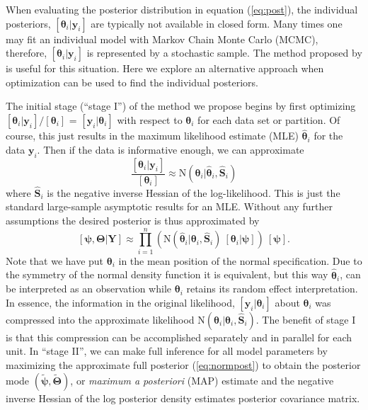 \documentclass[12pt]{article}
\newcommand{\by}{\mathbf{y}}
\newcommand{\bt}{\boldsymbol{\theta}}
\newcommand{\bT}{\boldsymbol{\Theta}}
\newcommand{\bp}{\boldsymbol{\psi}}
\newcommand{\bS}{\mathbf{S}}
\newcommand{\bY}{\mathbf{Y}}
\begin{document}
When evaluating the posterior distribution in equation (\ref{eq:post}), the individual posteriors, $[\bt_i|\by_i]$ are typically not available in closed form. Many times one may fit an individual model with Markov Chain Monte Carlo (MCMC), therefore, $[\bt_i|\by_i]$ is represented by a stochastic sample. The method proposed by \citet{lunn2013fully} is useful for this situation. Here we explore an alternative approach when optimization can be used to find the individual posteriors.

The initial stage (``stage I'') of the method we propose begins by first optimizing $[\bt_i|\by_i]/[\bt_i]$ = $[\by_i|\bt_i]$ with respect to $\bt_i$ for each data set or partition. Of course, this just results in the maximum likelihood estimate (MLE) $\hat{\bt}_i$ for the data $\by_i$. Then if the data is informative enough, we can approximate 
\[
\frac{[\bt_i|\by_i]}{[\bt_i]} \approx \text{N}(\bt_i|\hat{\bt}_i, \hat{\bS}_i)
\]
where $\hat{\bS}_i$ is the negative inverse Hessian of the log-likelihood. This is just the standard large-sample asymptotic results for an MLE. Without any further assumptions the desired posterior is thus approximated by
\begin{equation}
\label{eq:normpost}
[\bp,\bT|\bY] \approx  \prod_{i=1}^n\left(\text{N}(\hat{\bt}_i|\bt_i, \hat{\bS}_i)\ [\bt_i|\bp]\right)\ [\bp].
\end{equation}
Note that we have put $\bt_i$ in the mean position of the normal specification. Due to the symmetry of the normal density function it is equivalent, but this way $\hat{\bt}_i$, can be interpreted as an observation while $\bt_i$ retains its random effect interpretation. In essence, the information in the original likelihood, $[\by_i|\bt_i]$ about $\bt_i$ was compressed into the approximate likelihood $\text{N}(\hat{\bt}_i|\bt_i, \hat{\bS}_i)$. The benefit of stage I is that this compression can be accomplished separately and in parallel for each unit. In ``stage II'', we can make full inference for all model parameters by maximizing the approximate full posterior (\ref{eq:normpost}) to obtain the posterior mode $(\tilde{\bp},\tilde{\bT})$, or {\it maximum a posteriori} (MAP) estimate and the negative inverse Hessian of the log posterior density estimates posterior covariance matrix. 
\end{document}
